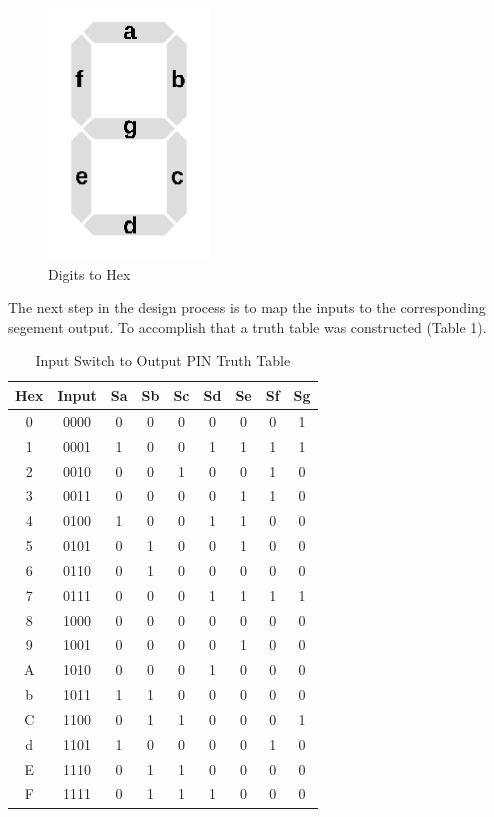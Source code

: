 \documentclass{article}
\begin{document}
\begin{figure}[H]
  \centering
  \includegraphics[width=.2\textwidth]{seg_display.png}
  \caption{Digits to Hex}
\end{figure}

The next step in the design process is to map the inputs to the corresponding segement output. To accomplish that a truth table was constructed (Table 1).

\begin{table}[H]
\centering
\begin{tabular}{|c|c|c|c|c|c|c|c|c|}
\hline
Hex & Input & Sa & Sb & Sc & Sd & Se & Sf & Sg \\
\hline
0 & 0000 & 0 & 0 & 0 & 0 & 0 & 0 & 1 \\
\hline
1 & 0001 & 1 & 0 & 0 & 1 & 1 & 1 & 1 \\
\hline
2 & 0010 & 0 & 0 & 1 & 0 & 0 & 1 & 0 \\
\hline
3 & 0011 & 0 & 0 & 0 & 0 & 1 & 1 & 0 \\
\hline
4 & 0100 & 1 & 0 & 0 & 1 & 1 & 0 & 0 \\
\hline
5 & 0101 & 0 & 1 & 0 & 0 & 1 & 0 & 0 \\
\hline
6 & 0110 & 0 & 1 & 0 & 0 & 0 & 0 & 0 \\
\hline
7 & 0111 & 0 & 0 & 0 & 1 & 1 & 1 & 1 \\
\hline
8 & 1000 & 0 & 0 & 0 & 0 & 0 & 0 & 0 \\
\hline
9 & 1001 & 0 & 0 & 0 & 0 & 1 & 0 & 0 \\
\hline
A & 1010 & 0 & 0 & 0 & 1 & 0 & 0 & 0 \\
\hline
b & 1011 & 1 & 1 & 0 & 0 & 0 & 0 & 0 \\
\hline
C & 1100 & 0 & 1 & 1 & 0 & 0 & 0 & 1 \\
\hline
d & 1101 & 1 & 0 & 0 & 0 & 0 & 1 & 0 \\
\hline
E & 1110 & 0 & 1 & 1 & 0 & 0 & 0 & 0 \\
\hline
F & 1111 & 0 & 1 & 1 & 1 & 0 & 0 & 0 \\
\hline
\end{tabular}
\caption{Input Switch to Output PIN Truth Table}
\end{table}
\end{document}
